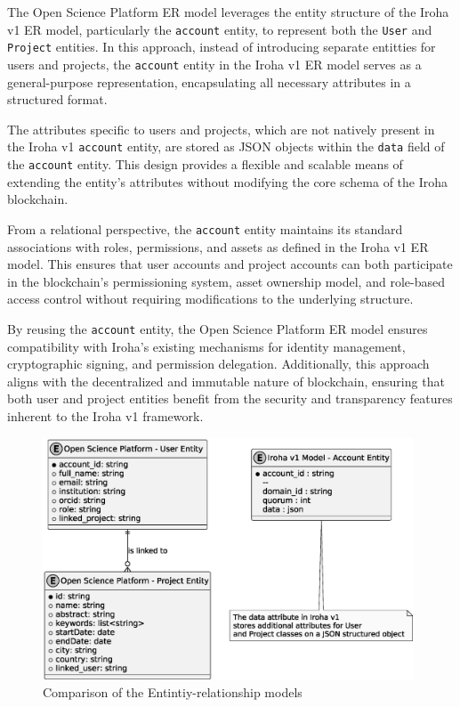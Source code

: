\documentclass{article}
\begin{document}
The Open Science Platform ER model leverages the entity structure of the Iroha v1 ER model, particularly the \texttt{account} entity, to represent both the \texttt{User} and \texttt{Project} entities. In this approach, instead of introducing separate entitties for users and projects, the \texttt{account} entity in the Iroha v1 ER model serves as a general-purpose representation, encapsulating all necessary attributes in a structured format.

The attributes specific to users and projects, which are not natively present in the Iroha v1 \texttt{account} entity, are stored as JSON objects within the \texttt{data} field of the \texttt{account} entity. This design provides a flexible and scalable means of extending the entity's attributes without modifying the core schema of the Iroha blockchain.

From a relational perspective, the \texttt{account} entity maintains its standard associations with roles, permissions, and assets as defined in the Iroha v1 ER model. This ensures that user accounts and project accounts can both participate in the blockchain's permissioning system, asset ownership model, and role-based access control without requiring modifications to the underlying structure.

By reusing the \texttt{account} entity, the Open Science Platform ER model ensures compatibility with Iroha's existing mechanisms for identity management, cryptographic signing, and permission delegation. Additionally, this approach aligns with the decentralized and immutable nature of blockchain, ensuring that both user and project entities benefit from the security and transparency features inherent to the Iroha v1 framework.



\begin{figure}[htbp]
      \centering
      \includegraphics[width=0.98\textwidth, keepaspectratio]{comparing_er_models.eps}
      \caption{Comparison of the Entintiy-relationship models}
      \label{fig:comparing_er_models}
\end{figure}
\end{document}
